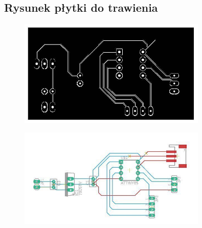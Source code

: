 \documentclass{article}
\begin{document}



\subsection{Rysunek płytki do trawienia}
\begin{figure}[h]
    \centering
    \includegraphics[width=0.8\textwidth]{plytka1.jpg}
    \label{fig:plytka1}
\end{figure}

\begin{figure}[h]
    \centering
    \includegraphics[width=0.8\textwidth]{plytka2.jpg}
    \label{fig:plytka2}
\end{figure}
\end{document}
